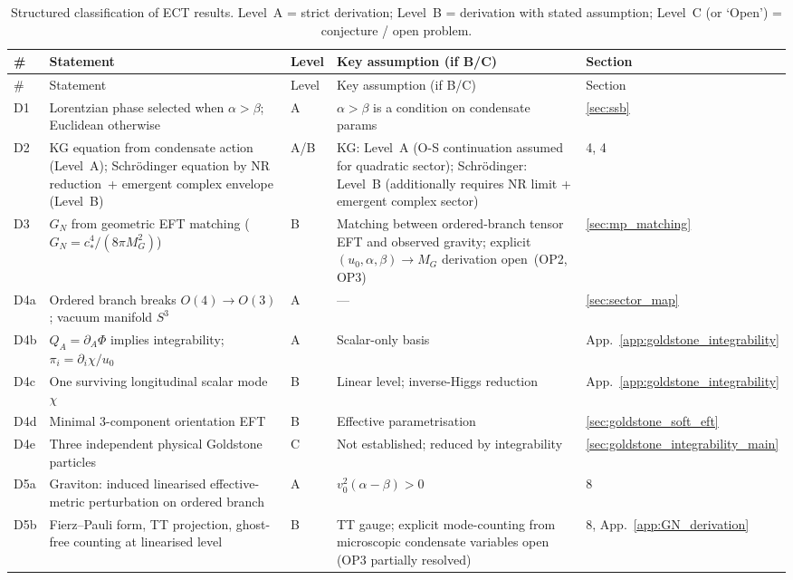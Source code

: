 \documentclass[11pt,a4paper]{article}
\numberwithin{equation}{section}
\begin{document}
\begin{longtable}{@{}p{}p{}p{}p{}p{}@{}}
\caption{Structured classification of ECT results. Level~A = strict derivation; Level~B = derivation with stated assumption; Level~C (or `Open') = conjecture / open problem.}
\label{tab:ect-levels}\\
\toprule
\# & Statement & Level & Key assumption (if B/C) & Section \\
\midrule
\endfirsthead
\toprule
\# & Statement & Level & Key assumption (if B/C) & Section \\
\midrule
\endhead
D1 & Lorentzian phase selected when $\alpha>\beta$; Euclidean otherwise & A & $\alpha>\beta$ is a condition on condensate params & \ref{sec:ssb} \\
D2 & KG equation from condensate action (Level~A); Schr\"odinger equation by NR reduction~+ emergent complex envelope (Level~B) & A/B & KG: Level~A (O-S continuation assumed for quadratic sector); Schr\"odinger: Level~B (additionally requires NR limit + emergent complex sector) & 4, 4 \\
D3 & $G_N$ from geometric EFT matching ($G_N=c_*^4/(8\pi M_G^2)$) & B & Matching between ordered-branch tensor EFT and observed gravity; explicit $(u_0,\alpha,\beta)\to M_G$ derivation open~(OP2, OP3) & \ref{sec:mp_matching} \\
D4a & Ordered branch breaks $O(4)\to O(3)$; vacuum manifold $S^3$ & A & --- & \ref{sec:sector_map} \\
D4b & $Q_A=\partial_A\Phi$ implies integrability; $\pi_i=\partial_i\chi/u_0$ & A & Scalar-only basis & App.~\ref{app:goldstone_integrability} \\
D4c & One surviving longitudinal scalar mode $\chi$ & B & Linear level; inverse-Higgs reduction & App.~\ref{app:goldstone_integrability} \\
D4d & Minimal 3-component orientation EFT & B & Effective parametrisation & \ref{sec:goldstone_soft_eft} \\
D4e & Three independent physical Goldstone particles & C & Not established; reduced by integrability & \ref{sec:goldstone_integrability_main} \\
D5a & Graviton: induced linearised effective-metric perturbation on ordered branch & A & $v_0^2(\alpha-\beta)>0$ & 8 \\
D5b & Fierz--Pauli form, TT projection, ghost-free counting at linearised level & B & TT gauge; explicit mode-counting from microscopic condensate variables open (OP3 partially resolved) & 8, App.~\ref{app:GN_derivation} \\

\end{longtable}
\end{document}
